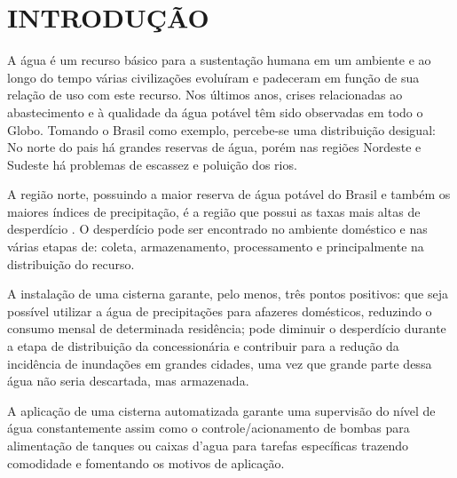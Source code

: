 
\chapter{INTRODUÇÃO}
\label{chap:introducao}


A água é um recurso básico para a sustentação humana em um ambiente e ao longo do tempo várias civilizações evoluíram e padeceram em função de sua relação de uso com este recurso. Nos últimos anos, crises relacionadas ao abastecimento e à qualidade da água potável têm sido observadas em todo o Globo. Tomando o Brasil como exemplo, percebe-se uma distribuição desigual: No norte do pais há grandes reservas de água, porém nas regiões Nordeste e Sudeste há problemas de escassez e poluição dos rios.


A região norte, possuindo a maior reserva de água potável do Brasil e também os maiores índices de precipitação, é a região que possui as taxas mais altas de desperdício \cite{globo}. O desperdício pode ser encontrado no ambiente doméstico e nas várias etapas de: coleta, armazenamento, processamento e principalmente na distribuição do recurso. 

A instalação de uma cisterna garante, pelo menos, três pontos positivos: que seja possível utilizar a água de precipitações para afazeres domésticos, reduzindo o consumo mensal de determinada residência; pode diminuir o desperdício durante a etapa de distribuição da concessionária e contribuir para a redução da
incidência de inundações em grandes cidades, uma vez que grande parte dessa água não seria descartada, mas armazenada.

A aplicação de uma cisterna automatizada garante uma supervisão do nível de água constantemente assim como o controle/acionamento de bombas para alimentação de tanques ou caixas d’agua para tarefas específicas trazendo comodidade e fomentando os motivos de aplicação.